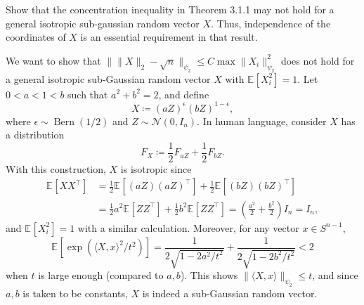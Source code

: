 \begin{problem*}[Exercise 3.4.10]\label{ex3.4.10}
	Show that the concentration inequality in Theorem 3.1.1 may not hold for a general isotropic sub-gaussian random vector \(X\). Thus, independence of the coordinates of \(X\) is an essential requirement in that result.
\end{problem*}
\begin{answer}
	We want to show that \(\lVert \lVert X \rVert _2 - \sqrt{n} \rVert _{\psi _2} \leq C \max \lVert X_i \rVert _{\psi _2}^2\) does not hold for a general isotropic sub-Gaussian random vector \(X\) with \(\mathbb{E}_{}[X_i^2 ] = 1\). Let \(0 < a < 1 < b\) such that \(a^2 + b^2  = 2\), and define
	\[
		X \coloneqq (aZ)^{\epsilon}(bZ)^{1 - \epsilon},
	\]
	where \(\epsilon \sim \operatorname{Bern}(1 / 2) \) and \(Z \sim \mathcal{N} (0, I_n)\). In human language, consider \(X\) has a distribution
	\[
		F_X \coloneqq \frac{1}{2} F_{aZ} + \frac{1}{2} F_{bZ}.
	\]
	With this construction, \(X\) is isotropic since
	\[
		\begin{split}
			\mathbb{E}_{}[X X^{\top} ]
			 & = \frac{1}{2} \mathbb{E}_{}[(aZ)(aZ)^{\top} ] + \frac{1}{2} \mathbb{E}_{}[(bZ)(bZ)^{\top} ] \\
			 & = \frac{1}{2} a^2 \mathbb{E}_{}[Z Z^{\top} ] + \frac{1}{2} b^2 \mathbb{E}_{}[Z Z^{\top} ]
			= \left( \frac{a^2}{2} + \frac{b^2}{2} \right) I_n
			= I_n,
		\end{split}
	\]
	and \(\mathbb{E}_{}[X_i^2] = 1\) with a similar calculation. Moreover, for any vector \(x \in S^{n-1}\),
	\[
		\mathbb{E}_{}[\exp (\langle X, x \rangle ^2 / t^2)]
		= \frac{1}{2 \sqrt{1 - 2 a^2 / t^2} } + \frac{1}{2 \sqrt{1 - 2b^2 / t^2} }
		< 2
	\]
	when \(t\) is large enough (compared to \(a, b\)). This shows \(\lVert \langle X, x \rangle \rVert _{\psi _2} \leq t\), and since \(a, b\) is taken to be constants, \(X\) is indeed a sub-Gaussian random vector.


\end{answer}
